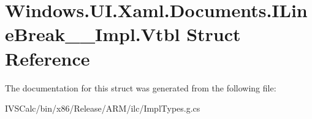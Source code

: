 \hypertarget{struct_windows_1_1_u_i_1_1_xaml_1_1_documents_1_1_i_line_break_____impl_1_1_vtbl}{}\section{Windows.\+U\+I.\+Xaml.\+Documents.\+I\+Line\+Break\+\_\+\+\_\+\+Impl.\+Vtbl Struct Reference}
\label{struct_windows_1_1_u_i_1_1_xaml_1_1_documents_1_1_i_line_break_____impl_1_1_vtbl}


The documentation for this struct was generated from the following file\+:\begin{DoxyCompactItemize}
\item 
I\+V\+S\+Calc/bin/x86/\+Release/\+A\+R\+M/ilc/Impl\+Types.\+g.\+cs\end{DoxyCompactItemize}
